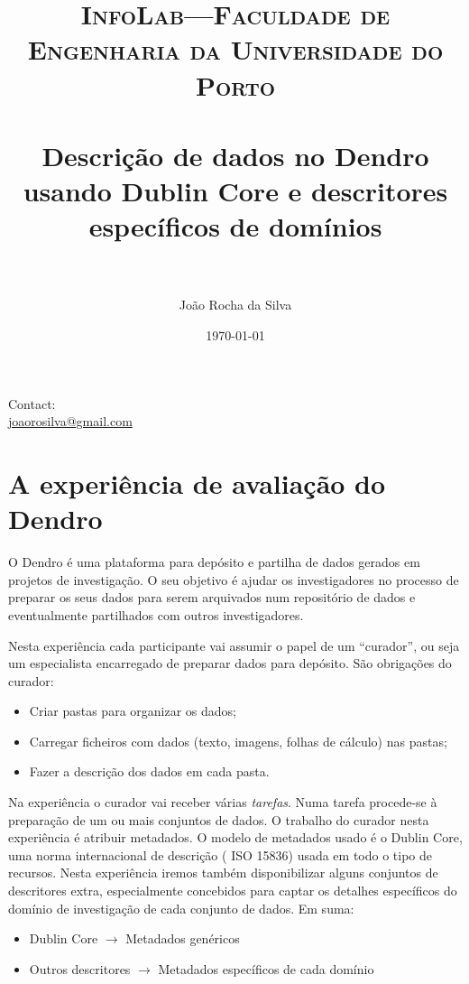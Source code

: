 \documentclass[paper=a4, fontsize=11pt]{scrartcl} %
\title{	
\normalfont \normalsize 
\textsc{InfoLab---Faculdade de Engenharia da Universidade do Porto} \\ [25pt] %
\horrule{0.5pt} \\[0.4cm] %
\huge Descrição de dados no Dendro\\ usando Dublin Core e descritores específicos de domínios \\ %
\horrule{2pt} \\[0.5cm] %
}
\author{João Rocha da Silva} %
\date{\normalsize\today} %
\numberwithin{equation}{section} %
\numberwithin{figure}{section} %
\numberwithin{table}{section} %
\begin{document}
\maketitle %


\begin{center}
	Contact:\\\url{joaorosilva@gmail.com}
\end{center}

\section{A experiência de avaliação do Dendro}

O Dendro é uma plataforma para depósito e partilha de dados gerados em projetos de investigação. O seu objetivo é ajudar os investigadores no processo de preparar os seus dados para serem arquivados num repositório de dados e eventualmente partilhados com outros investigadores.

Nesta experiência cada participante  vai assumir o papel de um ``curador'', ou seja um especialista encarregado de preparar dados para depósito. São obrigações do curador:
\begin{itemize}
\item Criar pastas para organizar os dados;
\item Carregar ficheiros com dados (texto, imagens, folhas de cálculo) nas pastas;
\item Fazer a descrição dos dados em cada pasta.
\end{itemize}

Na experiência o curador vai receber várias \emph{tarefas}. Numa tarefa procede-se à preparação de um ou mais conjuntos de dados. O trabalho do curador nesta experiência é atribuir metadados. O modelo de metadados usado é o Dublin Core, uma norma internacional de descrição ( ISO 15836) usada em todo o tipo de recursos. Nesta experiência iremos também disponibilizar alguns conjuntos de descritores extra, especialmente concebidos para captar os detalhes específicos do domínio de investigação de cada conjunto de dados. Em suma:
\begin{itemize}
	\item Dublin Core $\rightarrow$ Metadados genéricos
	\item Outros descritores $\rightarrow$ Metadados específicos de cada domínio
\end{itemize}
\end{document}
